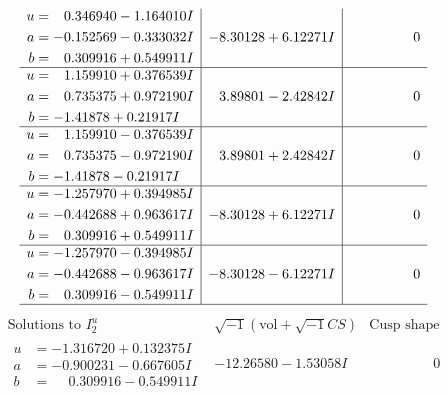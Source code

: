 \documentclass[1p]{elsarticle_modified}
\theoremstyle{definition}
\newcommand{\I}{\sqrt{-1}}
\begin{document}
$$\begin{array}{c|c|c}
\begin{aligned}
u &= \phantom{-}0.346940 - 1.164010 I \\
a &= -0.152569 - 0.333032 I \\
b &= \phantom{-}0.309916 + 0.549911 I\end{aligned}
 & -8.30128 + 6.12271 I & \phantom{-0.000000 } 0 \\ \hline\begin{aligned}
u &= \phantom{-}1.159910 + 0.376539 I \\
a &= \phantom{-}0.735375 + 0.972190 I \\
b &= -1.41878 + 0.21917 I\end{aligned}
 & \phantom{-}3.89801 - 2.42842 I & \phantom{-0.000000 } 0 \\ \hline\begin{aligned}
u &= \phantom{-}1.159910 - 0.376539 I \\
a &= \phantom{-}0.735375 - 0.972190 I \\
b &= -1.41878 - 0.21917 I\end{aligned}
 & \phantom{-}3.89801 + 2.42842 I & \phantom{-0.000000 } 0 \\ \hline\begin{aligned}
u &= -1.257970 + 0.394985 I \\
a &= -0.442688 + 0.963617 I \\
b &= \phantom{-}0.309916 + 0.549911 I\end{aligned}
 & -8.30128 + 6.12271 I & \phantom{-0.000000 } 0 \\ \hline\begin{aligned}
u &= -1.257970 - 0.394985 I \\
a &= -0.442688 - 0.963617 I \\
b &= \phantom{-}0.309916 - 0.549911 I\end{aligned}
 & -8.30128 - 6.12271 I & \phantom{-0.000000 } 0\\
 \hline 
 \end{array}$$\newpage$$\begin{array}{c|c|c}  
\text{Solutions to }I^u_{2}& \I (\text{vol} + \sqrt{-1}CS) & \text{Cusp shape}\\
 \hline 
\begin{aligned}
u &= -1.316720 + 0.132375 I \\
a &= -0.900231 - 0.667605 I \\
b &= \phantom{-}0.309916 - 0.549911 I\end{aligned}
 & -12.26580 - 1.53058 I & \phantom{-0.000000 } 0 \\ \hline\begin{aligned}

\end{aligned}
\end{array}$$
\end{document}

